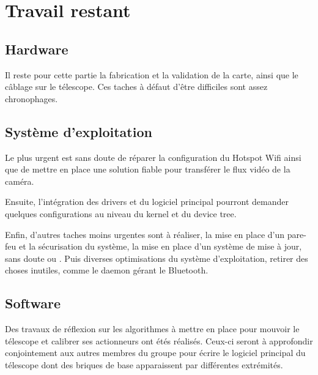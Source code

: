 \chapter{Travail restant}

\section{Hardware}

Il reste pour cette partie la fabrication et la validation de la carte, ainsi que le câblage sur le télescope. Ces taches à défaut d'être difficiles sont assez chronophages.

\section{Système d'exploitation}

Le plus urgent est sans doute de réparer la configuration du Hotspot Wifi ainsi que de mettre en place une solution fiable pour transférer le flux vidéo de la caméra.

Ensuite, l'intégration des drivers et du logiciel principal pourront demander quelques configurations au niveau du kernel et du device tree.

Enfin, d'autres taches moins urgentes sont à réaliser, la mise en place d'un pare-feu et la sécurisation du système, la mise en place d'un système de mise à jour, sans doute  ou . Puis diverses optimisations du système d'exploitation, retirer des choses inutiles, comme le daemon gérant le Bluetooth.

\section{Software}

Des travaux de réflexion sur les algorithmes à mettre en place pour mouvoir le télescope et calibrer ses actionneurs ont étés réalisés. Ceux-ci seront à approfondir conjointement aux autres membres du groupe pour écrire le logiciel principal du télescope dont des briques de base apparaissent par différentes extrémités.
